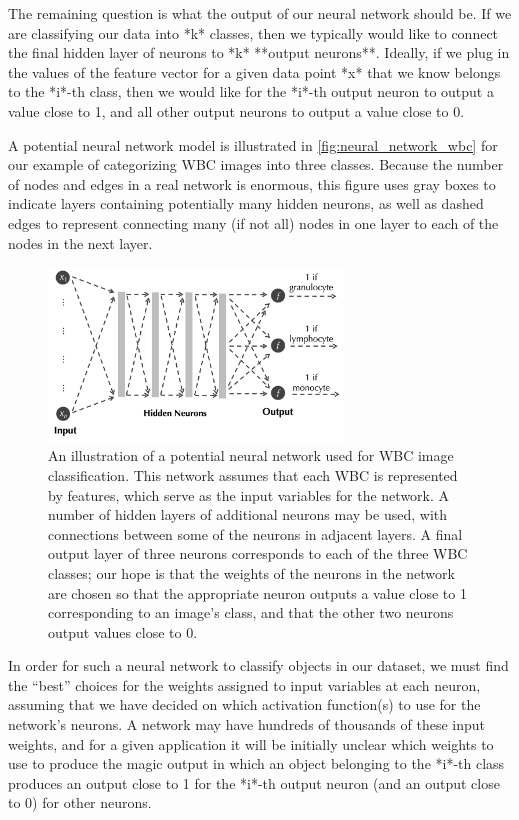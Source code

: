 The remaining question is what the output of our neural network should be. If we are classifying our data into *k* classes, then we typically would like to connect the final hidden layer of neurons to *k* **output neurons**. Ideally, if we plug in the values of the feature vector for a given data point *x* that we know belongs to the *i*-th class, then we would like for the *i*-th output neuron to output a value close to 1, and all other output neurons to output a value close to 0.

A potential neural network model is illustrated in \autoref{fig:neural_network_wbc} for our example of categorizing WBC images into three classes. Because the number of nodes and edges in a real network is enormous, this figure uses gray boxes to indicate layers containing potentially many hidden neurons, as well as dashed edges to represent connecting many (if not all) nodes in one layer to each of the nodes in the next layer.\\

\begin{figure}[h]
\centering
\mySfFamily
\includegraphics[width = 0.7\textwidth]{../images/neural_network_wbc.png}
\caption{An illustration of a potential neural network used for WBC image classification. This network assumes that each WBC is represented by  features, which serve as the input variables for the network. A number of hidden layers of additional neurons may be used, with connections between some of the neurons in adjacent layers. A final output layer of three neurons corresponds to each of the three WBC classes; our hope is that the weights of the neurons in the network are chosen so that the appropriate neuron outputs a value close to 1 corresponding to an image's class, and that the other two neurons output values close to 0.}
\label{fig:activation_function}
\end{figure}

In order for such a neural network to classify objects in our dataset, we must find the ``best'' choices for the weights assigned to input variables at each neuron, assuming that we have decided on which activation function(s) to use for the network's neurons. A network may have hundreds of thousands of these input weights, and for a given application it will be initially unclear which weights to use to produce the magic output in which an object belonging to the *i*-th class produces an output close to 1 for the *i*-th output neuron (and an output close to 0) for other neurons.

